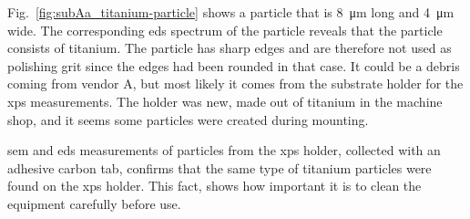 Fig.~\ref{fig:subAa_titanium-particle} shows a particle that is \SI{8}{\micro\metre} long and \SI{4}{\micro\metre} wide. The corresponding \ac{eds} spectrum of the particle reveals that the particle consists of titanium. The particle has sharp edges and are therefore not used as polishing grit since the edges had been rounded in that case. It could be a debris coming from vendor A, but most likely it comes from the substrate holder for the \ac{xps} measurements. The holder was new, made out of titanium in the machine shop, and it seems some particles were created during mounting.

\begin{comment}
\begin{figure}[htbp]
    \centering
    \subfigure[SEM image at a magnification of 12000$\times$.]{\texttt{[image: titan\_sem.jpg]}\label{fig:titan_sem}}
    \quad
    \subfigure[EDS.]{\texttt{[image: titan\_eds.jpg]}\label{fig:titan_eds}}
    \caption[]{Scanning electron microscopy (SEM) image and the corresponding \acf{eds} spectrum of a particle on substrate A at a magnification of 12000$\times$).}
    \label{fig:subA_Ti}
\end{figure}
\end{comment}


\Ac{sem} and \ac{eds} measurements of particles from the \ac{xps} holder, collected with an adhesive carbon tab, confirms that the same type of titanium particles were found on the \ac{xps} holder. This fact, shows how important it is to clean the equipment carefully before use. %

\begin{comment}
\begin{figure}[htbp]
    \centering
      \begin{minipage}[t]{0.49\linewidth}
        \centering
        \texttt{[image: subAa\_sem-holder\_b\_m001.jpg]}
      \end{minipage}
      \begin{minipage}[t]{0.49\linewidth}
        \centering
        \texttt{[image: unknown.png]}
      \end{minipage}
    \caption[\Ac{sem} image and corresponding \ac{eds} spectrum of titanium particle.]{A \ac{sem} image and the corresponding \ac{eds} spectrum of a titanium particle found on the holder used to transport substrates into the \ac{xps} chamber. The particles is \SI{8}{\micro\metre} long and consisting mainly of titanium. A carbon tab can be seen under the particle.}
    \label{fig:subAa_titanium}%
\end{figure}
\end{comment}

